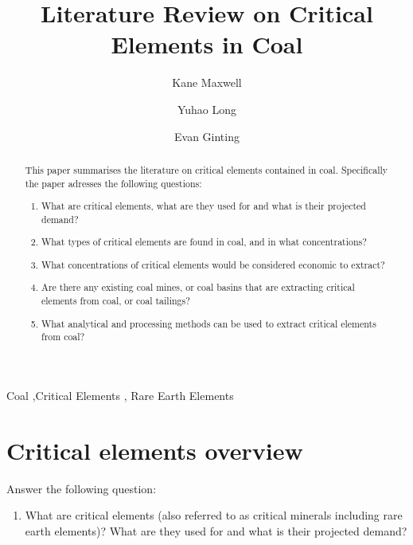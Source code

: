 \documentclass[preprint, 3p,
authoryear]{elsarticle} %
\providecommand{\tightlist}{%
  \setlength{\itemsep}{0pt}\setlength{\parskip}{0pt}}
\begin{document}
\begin{frontmatter}

  \title{Literature Review on Critical Elements in Coal}
    \author[Matrix Geoscience]{Kane Maxwell%
  }
    \author[Monash University]{Yuhao Long%
  }
    \author[Monash University]{Evan Ginting%
  }
  
  \begin{abstract}
  This paper summarises the literature on critical elements contained in
  coal. Specifically the paper adresses the following questions:

  \begin{enumerate}
  \def\labelenumi{\arabic{enumi})}
  \item
    What are critical elements, what are they used for and what is their
    projected demand?
  \item
    What types of critical elements are found in coal, and in what
    concentrations?
  \item
    What concentrations of critical elements would be considered
    economic to extract?
  \item
    Are there any existing coal mines, or coal basins that are
    extracting critical elements from coal, or coal tailings?
  \item
    What analytical and processing methods can be used to extract
    critical elements from coal?
  \end{enumerate}
  \end{abstract}
    \begin{keyword}
    Coal \sep Critical Elements \sep 
    Rare Earth Elements
  \end{keyword}
  
 \end{frontmatter}

\hypertarget{critical-elements-overview}{%
\section{Critical elements overview}\label{critical-elements-overview}}

Answer the following question:

\begin{enumerate}
\def\labelenumi{\arabic{enumi}.}
\tightlist
\item
  What are critical elements (also referred to as critical minerals
  including rare earth elements)? What are they used for and what is
  their projected demand?
\end{enumerate}
\end{document}
